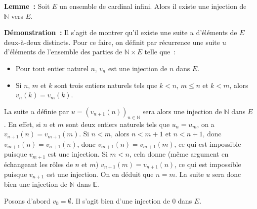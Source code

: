     \done 

\medskip

\noindent\textbf{Lemme :} Soit $E$ un ensemble de cardinal infini. Alors il existe une injection de $\mathbb{N}$ vers $E$. 

\medskip

\noindent\textbf{Démonstration :} Il s'agit de montrer qu'il existe une suite $u$ d'éléments de $E$ deux-à-deux distincts. 
    Pour ce faire, on définit par récurrence une suite $u$ d'éléments de l'ensemble des parties de $\mathbb{N} \times E$ telle que : 
    \begin{itemize}[nosep]
        \item Pour tout entier naturel $n$, $v_n$ est une injection de $n$ dans $E$.
        \item Si $n$, $m$ et $k$ sont trois entiers naturels tels que $k < n$, $m \leq n$ et $k < m$, alors $v_n(k) = v_m(k)$. 
    \end{itemize}
    La suite $u$ définie par $u = \left( v_{n+1}(n) \right)_{n \in \mathbb{N}}$ sera alors une injection de $\mathbb{N}$ dans $E$. 
    En effet, si $n$ et $m$ sont deux entiers naturels tels que $u_n = u_m$, on a $v_{n+1}(n) = v_{m+1}(m)$. 
    Si $n < m$, alors $n < m+1$ et $n < n+1$, donc $v_{m+1}(n) = v_{n+1}(n)$, donc $v_{m+1}(n) = v_{m+1}(m)$, ce qui est impossible puisque $v_{m+1}$ est une injection.
    Si $m < n$, cela donne (même argument en échangeant les rôles de $n$ et $m$) $v_{n+1}(m) = v_{n+1}(n)$, ce qui est impossible puisque $v_{n+1}$ est une injection. 
    On en déduit que $n=m$. 
    La suite $u$ sera donc bien une injection de $\mathbb{N}$ dans $\mathbb{E}$.

    Posons d'abord $v_0 = \emptyset$. 
    Il s'agit bien d'une injection de $0$ dans $E$.

